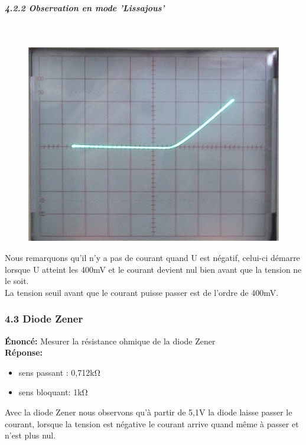 \documentclass{report}
\begin{document}
\pagebreak

\subparagraph*{4.2.2 Observation en mode 'Lissajous'} ~~\\

\begin{figure}[h!]
\centering
\includegraphics[scale=0.5]{Lissajou.jpg}
\end{figure}
Nous remarquons qu'il n'y a pas de courant quand U est négatif, celui-ci démarre lorsque U atteint les 400mV et le courant devient nul bien avant que la tension ne le soit.
\\ La tension seuil avant que le courant puisse passer est de l'ordre de 400mV.

\subsubsection*{4.3 Diode Zener}

\textbf{\'Enonc\'e:} Mesurer la résistance ohmique de la diode Zener \\

\textbf{R\'eponse:} 

\begin{itemize}
\item sens passant : 0,712k$\si{\ohm}$
\item sens bloquant: 1k$\si{\ohm}$
\end{itemize}

Avec la diode Zener nous observons qu'à partir de 5,1V la diode laisse passer le courant, lorsque la tension est négative le courant arrive quand même à passer et n'est plus nul.
\end{document}
